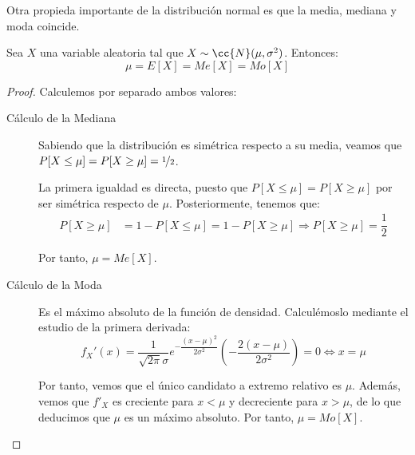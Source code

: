 Otra propieda importante de la distribución normal es que la media, mediana y moda coincide.
\begin{coro}
    Sea $X$ una variable aleatoria tal que $X\sim \cc{N}(\mu,\sigma^2)$. Entonces:
    \begin{equation*}
        \mu = E[X] = Me[X] = Mo[X]
    \end{equation*}
\end{coro}
\begin{proof}
    Calculemos por separado ambos valores:
    \begin{description}
        \item[Cálculo de la Mediana] Sabiendo que la distribución es simétrica respecto a su media, 
        veamos que $P[X\leq \mu] = P[X\geq \mu] = \nicefrac{1}{2}$.

        La primera igualdad es directa, puesto que $P[X\leq \mu] = P[X\geq \mu]$ por ser simétrica respecto de $\mu$.
        Posteriormente, tenemos que:
        \begin{align*}
            P[X\geq \mu] &= 1-P[X\leq \mu] = 1-P[X\geq \mu] \Longrightarrow P[X\geq \mu] = \dfrac{1}{2}
        \end{align*}

        Por tanto, $\mu=Me[X]$.

        \item[Cálculo de la Moda] Es el máximo absoluto de la función de densidad. Calculémoslo mediante el estudio de la primera derivada:
        \begin{equation*}
            f_X'(x) = \dfrac{1}{\sqrt{2\pi}\sigma} e^{-\dfrac{(x-\mu)^2}{2\sigma^2}} \left(-\dfrac{2(x-\mu)}{2\sigma^2}\right) = 0\Longleftrightarrow x=\mu
        \end{equation*}
        
        Por tanto, vemos que el único candidato a extremo relativo es $\mu$. Además, vemos que $f'_X$ es creciente para $x<\mu$ y decreciente para $x>\mu$,
        de lo que deducimos que $\mu$ es un máximo absoluto. Por tanto, $\mu = Mo[X]$.
    \end{description}
\end{proof}

